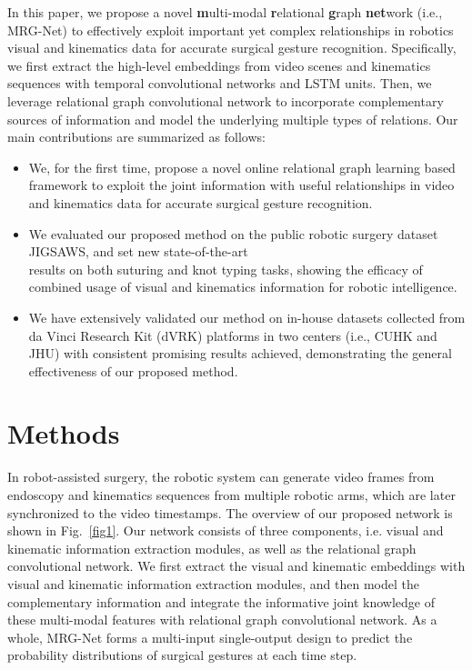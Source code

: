 \documentclass[letterpaper, 10 pt, conference]{ieeeconf}
\begin{document}
In this paper, we propose a novel \textbf{m}ulti-modal \textbf{r}elational \textbf{g}raph \textbf{net}work (i.e., MRG-Net) to effectively exploit important yet complex relationships in robotics visual and kinematics data for accurate surgical gesture recognition.
Specifically, we first extract the high-level embeddings from video scenes and kinematics sequences with temporal convolutional networks and LSTM units. Then, we leverage relational graph convolutional network to incorporate complementary sources of information and model the underlying multiple types of relations.
Our main contributions are summarized as follows:

\begin{itemize}
	\item We, for the first time, propose a novel online relational graph learning based framework to exploit the joint information with useful relationships in video and kinematics data for accurate surgical gesture recognition.
	\item We evaluated our proposed method on the public robotic surgery dataset JIGSAWS, and set new state-of-the-art \\
	results on both suturing and knot typing tasks, showing the efficacy of combined usage of visual and kinematics information for robotic intelligence.
	\item We have extensively validated our method on in-house datasets collected from da Vinci Research Kit (dVRK) platforms in two centers (i.e., CUHK and JHU) with consistent promising results achieved, demonstrating the general effectiveness of our proposed method.
\end{itemize}

\section{Methods}

In robot-assisted surgery, the robotic system can generate video frames from endoscopy and kinematics sequences from multiple robotic arms, which are later synchronized to the video timestamps. The overview of our proposed network is shown in Fig.~\ref{fig1}.
Our network consists of three components, i.e. visual and kinematic information extraction modules, as well as the relational graph convolutional network. We first extract the visual and kinematic embeddings with visual and kinematic information extraction modules, and then model the complementary information and integrate the informative joint knowledge of these multi-modal features with relational graph convolutional network. As a whole, MRG-Net forms a multi-input single-output design to predict the probability distributions of surgical gestures at each time step.
\end{document}
